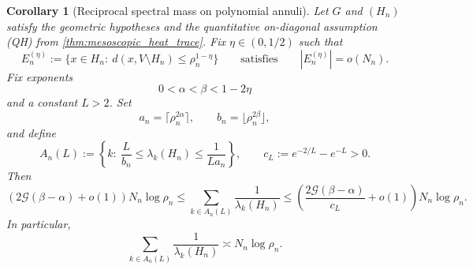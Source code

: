 \documentclass[reqno]{amsart}
\numberwithin{equation}{section}
\newtheorem{corollary}[corollary]{Corollary}
\theoremstyle{definition}
\theoremstyle{remark}
\newcommand{\Cref}[1]{\autoref{#1}}
\newcommand{\cG}{\mathcal{G}}
\begin{document}
\begin{corollary}[Reciprocal spectral mass on polynomial annuli]\label{cor:reciprocal_annulus}
Let $G$ and $(H_n)$ satisfy the geometric hypotheses and the quantitative on-diagonal assumption \textup{(QH)} from \Cref{thm:mesoscopic_heat_trace}. Fix $\eta\in(0,1/2)$ such that
\[
  E_n^{(\eta)}:=\{x\in H_n:\ d(x,V\setminus H_n)\le \rho_n^{1-\eta}\}
  \qquad\text{satisfies}\qquad
  |E_n^{(\eta)}|=o(N_n).
\]
Fix exponents
\[
  0<\alpha<\beta<1-2\eta
\]
and a constant $L>2$. Set
\[
  a_n=\lceil \rho_n^{2\alpha}\rceil,
  \qquad
  b_n=\lfloor \rho_n^{2\beta}\rfloor,
\]
and define
\[
  A_n(L):=\left\{k:\ \frac{L}{b_n}\le \lambda_k(H_n)\le \frac{1}{L a_n}\right\},
  \qquad
  c_L:=e^{-2/L}-e^{-L}>0.
\]
Then
\[
  \left(2\cG(\beta-\alpha)+o(1)\right)N_n\log\rho_n
  \le
  \sum_{k\in A_n(L)} \frac{1}{\lambda_k(H_n)}
  \le
  \left(\frac{2\cG(\beta-\alpha)}{c_L}+o(1)\right)N_n\log\rho_n.
\]
In particular,
\[
  \sum_{k\in A_n(L)} \frac{1}{\lambda_k(H_n)}
  \asymp
  N_n\log\rho_n.
\]
\end{corollary}
\end{document}
